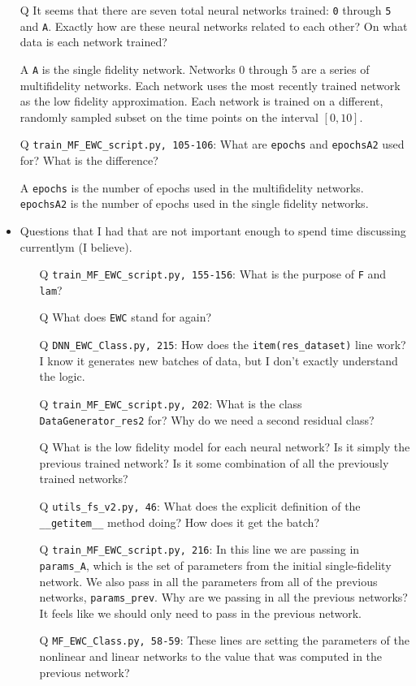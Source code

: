 \documentclass{article}
\begin{document}
\begin{itemize}
	\item[Q] It seems that there are seven total neural networks trained: \verb|0| through \verb|5| and \verb|A|. Exactly how are these neural networks related to each other? On what data is each network trained?
	\item[A] \verb|A| is the single fidelity network. Networks 0 through 5 are a series of multifidelity networks. Each network uses the most recently trained network as the low fidelity approximation. Each network is trained on a different, randomly sampled subset on the time points on the interval $[0,10]$. 
	\item[Q] \verb|train_MF_EWC_script.py, 105-106|: What are \verb|epochs| and \verb|epochsA2| used for? What is the difference?
	\item[A] \verb|epochs| is the number of epochs used in the multifidelity networks. \verb|epochsA2| is the number of epochs used in the single fidelity networks.
	\item Questions that I had that are not important enough to spend time discussing currentlym (I believe).
	\begin{itemize}
	\item[Q] \verb|train_MF_EWC_script.py, 155-156|: What is the purpose of \verb|F| and \verb|lam|?
	\item[Q] What does \verb|EWC| stand for again?
	\item[Q] \verb|DNN_EWC_Class.py, 215|: How does the \verb|item(res_dataset)| line work? I know it generates new batches of data, but I don't exactly understand the logic.
	\item[Q] \verb|train_MF_EWC_script.py, 202|: What is the class \verb|DataGenerator_res2| for? Why do we need a second residual class?
	\item[Q] What is the low fidelity model for each neural network? Is it simply the previous trained network? Is it some combination of all the previously trained networks?
	\item[Q] \verb|utils_fs_v2.py, 46|: What does the explicit definition of the \verb|__getitem__| method doing? How does it get the batch?
	\item[Q] \verb|train_MF_EWC_script.py, 216|: In this line we are passing in \verb|params_A|, which is the set of parameters from the initial single-fidelity network. We also pass in all the parameters from all of the previous networks, \verb|params_prev|. Why are we passing in all the previous networks? It feels like we should only need to pass in the previous network.
	\item[Q] \verb|MF_EWC_Class.py, 58-59|: These lines are setting the parameters of the nonlinear and linear networks to the value that was computed in the previous network?	
	\end{itemize}

\end{itemize}
\end{document}
